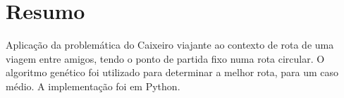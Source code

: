 \section{Resumo}
    \label{sec:res}
Aplicação da problemática do Caixeiro viajante ao contexto de rota de uma viagem entre amigos, tendo o ponto de partida fixo numa rota circular. O algoritmo genético foi utilizado para determinar a melhor rota, para um caso médio. A implementação foi em Python.

